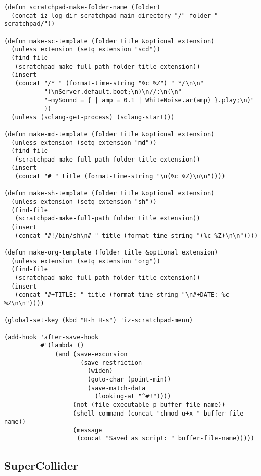 \documentclass{article}
\begin{document}
\begin{verbatim}
(defun scratchpad-make-folder-name (folder)
  (concat iz-log-dir scratchpad-main-directory "/" folder "-scratchpad/"))

(defun make-sc-template (folder title &optional extension)
  (unless extension (setq extension "scd"))
  (find-file
   (scratchpad-make-full-path folder title extension))
  (insert
   (concat "/* " (format-time-string "%c %Z") " */\n\n"
           "(\nServer.default.boot;\n)\n//:\n(\n"
           "~mySound = { | amp = 0.1 | WhiteNoise.ar(amp) }.play;\n)"
           ))
  (unless (sclang-get-process) (sclang-start)))

(defun make-md-template (folder title &optional extension)
  (unless extension (setq extension "md"))
  (find-file
   (scratchpad-make-full-path folder title extension))
  (insert
   (concat "# " title (format-time-string "\n(%c %Z)\n\n"))))

(defun make-sh-template (folder title &optional extension)
  (unless extension (setq extension "sh"))
  (find-file
   (scratchpad-make-full-path folder title extension))
  (insert
   (concat "#!/bin/sh\n# " title (format-time-string "(%c %Z)\n\n"))))

(defun make-org-template (folder title &optional extension)
  (unless extension (setq extension "org"))
  (find-file
   (scratchpad-make-full-path folder title extension))
  (insert
   (concat "#+TITLE: " title (format-time-string "\n#+DATE: %c %Z\n\n"))))

(global-set-key (kbd "H-h H-s") 'iz-scratchpad-menu)

(add-hook 'after-save-hook
          #'(lambda ()
              (and (save-excursion
                     (save-restriction
                       (widen)
                       (goto-char (point-min))
                       (save-match-data
                         (looking-at "^#!"))))
                   (not (file-executable-p buffer-file-name))
                   (shell-command (concat "chmod u+x " buffer-file-name))
                   (message
                    (concat "Saved as script: " buffer-file-name)))))
\end{verbatim}

\subsection{SuperCollider}
\label{sec-2-2}
\end{document}

